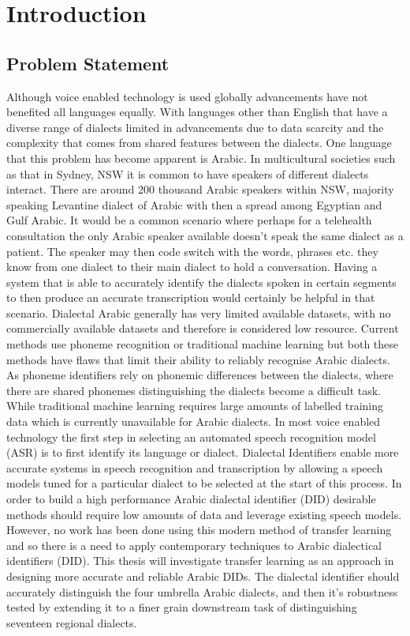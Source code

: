 \chapter{Introduction}\label{ch:intro}
\section{Problem Statement}\label{sec:problem}
Although voice enabled technology is used globally advancements have not benefited 
all languages equally. With languages other than English that have a diverse range of dialects limited in 
advancements due to data scarcity and the complexity that comes from shared 
features between the dialects. One language that this problem has  become apparent is
Arabic. In multicultural societies such as that in Sydney, NSW it is common to have speakers of different dialects interact. 
There are around 200 thousand Arabic speakers within NSW, majority speaking Levantine dialect of Arabic with then a spread among Egyptian and Gulf Arabic.
It would be a common scenario where perhaps for a telehealth consultation
the only Arabic speaker available doesn't speak the same dialect as a patient.
The speaker may then code switch with the words, phrases etc. they know from one dialect to their main dialect to hold a conversation. 
Having a system that is able to accurately identify the dialects spoken in certain segments to then produce an accurate transcription would certainly be helpful in that scenario. 
Dialectal Arabic generally has very limited available datasets, with no commercially available datasets and therefore is considered low resource. Current methods use phoneme recognition or 
traditional machine learning but both these methods have flaws that limit their ability to reliably recognise Arabic dialects. 
As phoneme identifiers rely on phonemic differences between the dialects, where there are shared phonemes distinguishing the dialects become a difficult task.
While traditional machine learning requires large amounts of labelled training data which is currently unavailable for Arabic dialects.  
In most voice enabled technology the first step in selecting an automated speech recognition model (ASR) is to first 
identify its language or dialect. Dialectal Identifiers enable more accurate systems in speech recognition and transcription by allowing 
a speech models tuned for a particular dialect to be selected at the start of this process. In order to build a high performance 
Arabic dialectal identifier (DID) desirable methods should require low amounts of data and leverage existing speech models. 
However, no work has been done using this modern method of transfer learning and so there is a need to apply contemporary techniques to Arabic dialectical identifiers (DID). 
This thesis will investigate transfer learning as an approach in designing more accurate and reliable Arabic DIDs. 
The dialectal identifier should accurately distinguish the four umbrella Arabic 
dialects, and then it's robustness tested by extending it to a finer grain downstream task of distinguishing seventeen regional dialects. 


